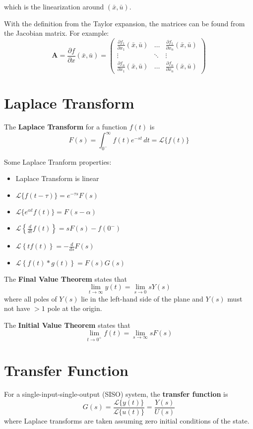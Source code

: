 \documentclass[11pt]{article}
\begin{document}
which is the linearization around \((\bar{x}, \bar{u})\).

With the definition from the Taylor expansion, the matrices can be found from the Jacobian matrix.
For example:
$$
\mathbf{A} = \frac{\partial f}{\partial x} ( \bar{x}, \bar{u} )
= \begin{pmatrix} \frac{\partial f_{1}}{\partial x_{1}} (\bar{x}, \bar{u}) & \dots & \frac{\partial f_{1}}{\partial x_{n}} (\bar{x}, \bar{u}) \\
\vdots & \ddots & \vdots \\
\frac{\partial f_{n}}{\partial x_{1}} (\bar{x}, \bar{u}) & \dots & \frac{\partial f_{n}}{\partial x_{n}} (\bar{x}, \bar{u}) \end{pmatrix}
$$
\section{Laplace Transform}
\label{sec:orgf018a5d}
The \textbf{Laplace Transform} for a function \(f(t)\) is
$$
F(s) = \int_{0^{-}}^{\infty} f(t) e^{-st} \, dt = \mathcal{L} \{ f(t) \}
$$

Some Laplace Tranform properties:
\begin{itemize}
\item Laplace Transform is linear
\item \(\mathcal{L}\{f(t - \tau)\} = e^{-\tau s}F(s)\)
\item \(\mathcal{L}\{e^{\alpha t} f(t)\} = F(s - \alpha)\)
\item \(\mathcal{L} \left\{ \frac{d}{dt} f(t) \right\} = sF(s) - f(0^{-})\)
\item \(\mathcal{L} \left\{ t f(t) \right\} = -\frac{d}{ds} F(s)\)
\item \(\mathcal{L} \left\{ f(t) * g(t) \right\} = F(s) G(s)\)
\end{itemize}

The \textbf{Final Value Theorem} states that
$$
\lim_{t \to \infty} y(t) = \lim_{s \to 0} sY(s)
$$
where all poles of \(Y(s)\) lie in the left-hand side of the plane and
\(Y(s)\) must not have \(>1\) pole at the origin.

The \textbf{Initial Value Theorem} states that
$$
\lim_{t \to 0^{+}} f(t) = \lim_{s \to \infty} sF(s)
$$
\section{Transfer Function}
\label{sec:orga041901}
For a single-input-single-output (SISO) system, the \textbf{transfer function} is
$$
G(s) = \frac{\mathcal{L}\{y(t)\}}{\mathcal{L}\{u(t)\}} = \frac{Y(s)}{U(s)}
$$
where Laplace transforms are taken assuming zero initial conditions of the
state.
\end{document}
